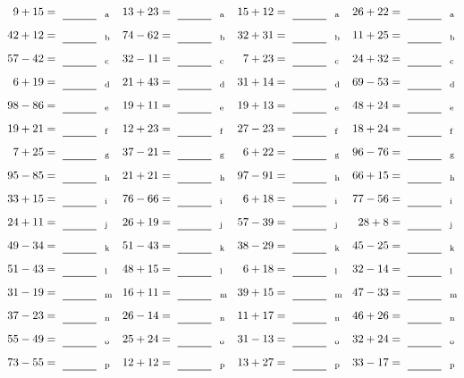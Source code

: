 \documentclass
[
  draft    = true,
  fontsize = 11pt,
  parskip  = half-
]
{scrartcl}
\begin{document}
\clearpage
\begin{align*}
    \pline{9+15}&=\rline{a}
  & \pline{13+23}&=\rline{a}
  & \pline{15+12}&=\rline{a}
  & \pline{26+22}&=\rline{a} \\[1ex]
    \pline{42+12}&=\rline{b}
  & \pline{74-62}&=\rline{b}
  & \pline{32+31}&=\rline{b}
  & \pline{11+25}&=\rline{b} \\[1ex]
    \pline{57-42}&=\rline{c}
  & \pline{32-11}&=\rline{c}
  & \pline{7+23}&=\rline{c}
  & \pline{24+32}&=\rline{c} \\[1ex]
    \pline{6+19}&=\rline{d}
  & \pline{21+43}&=\rline{d}
  & \pline{31+14}&=\rline{d}
  & \pline{69-53}&=\rline{d} \\[1ex]
    \pline{98-86}&=\rline{e}
  & \pline{19+11}&=\rline{e}
  & \pline{19+13}&=\rline{e}
  & \pline{48+24}&=\rline{e} \\[1ex]
    \pline{19+21}&=\rline{f}
  & \pline{12+23}&=\rline{f}
  & \pline{27-23}&=\rline{f}
  & \pline{18+24}&=\rline{f} \\[1ex]
    \pline{7+25}&=\rline{g}
  & \pline{37-21}&=\rline{g}
  & \pline{6+22}&=\rline{g}
  & \pline{96-76}&=\rline{g} \\[1ex]
    \pline{95-85}&=\rline{h}
  & \pline{21+21}&=\rline{h}
  & \pline{97-91}&=\rline{h}
  & \pline{66+15}&=\rline{h} \\[1ex]
    \pline{33+15}&=\rline{i}
  & \pline{76-66}&=\rline{i}
  & \pline{6+18}&=\rline{i}
  & \pline{77-56}&=\rline{i} \\[1ex]
    \pline{24+11}&=\rline{j}
  & \pline{26+19}&=\rline{j}
  & \pline{57-39}&=\rline{j}
  & \pline{28+8}&=\rline{j} \\[1ex]
    \pline{49-34}&=\rline{k}
  & \pline{51-43}&=\rline{k}
  & \pline{38-29}&=\rline{k}
  & \pline{45-25}&=\rline{k} \\[1ex]
    \pline{51-43}&=\rline{l}
  & \pline{48+15}&=\rline{l}
  & \pline{6+18}&=\rline{l}
  & \pline{32-14}&=\rline{l} \\[1ex]
    \pline{31-19}&=\rline{m}
  & \pline{16+11}&=\rline{m}
  & \pline{39+15}&=\rline{m}
  & \pline{47-33}&=\rline{m} \\[1ex]
    \pline{37-23}&=\rline{n}
  & \pline{26-14}&=\rline{n}
  & \pline{11+17}&=\rline{n}
  & \pline{46+26}&=\rline{n} \\[1ex]
    \pline{55-49}&=\rline{o}
  & \pline{25+24}&=\rline{o}
  & \pline{31-13}&=\rline{o}
  & \pline{32+24}&=\rline{o} \\[1ex]
    \pline{73-55}&=\rline{p}
  & \pline{12+12}&=\rline{p}
  & \pline{13+27}&=\rline{p}
  & \pline{33-17}&=\rline{p}
\end{align*}
\end{document}
